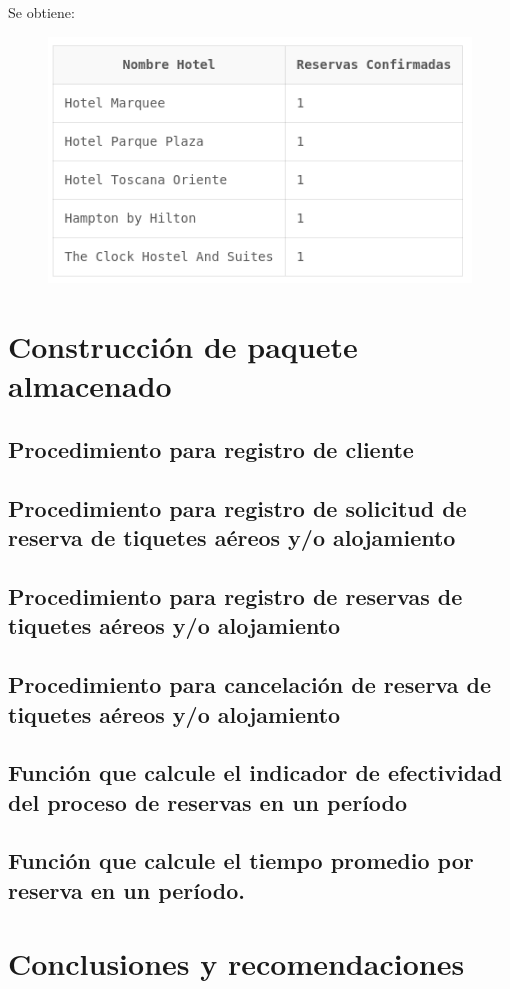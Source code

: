 \documentclass{article}
\begin{document}
Se obtiene:

\begin{figure}[h]
    \centering
    \includegraphics[width=0.75\linewidth]{img/Consulta_7.png}
\end{figure}

\newpage
\section{Construcción de paquete almacenado}
\subsection{Procedimiento para registro de cliente}
\subsection{Procedimiento para registro de solicitud de reserva de tiquetes aéreos y/o alojamiento}
\subsection{Procedimiento para registro de reservas de tiquetes aéreos y/o alojamiento}
\subsection{Procedimiento para cancelación de reserva de tiquetes aéreos y/o alojamiento}
\subsection{Función que calcule el indicador de efectividad del proceso de reservas en un período}
\subsection{Función que calcule el tiempo promedio por reserva en un período.}

\newpage
\section{Conclusiones y recomendaciones}
\end{document}
